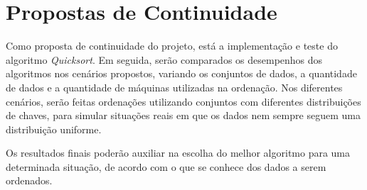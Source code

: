  
\section{Propostas de Continuidade}



Como proposta de continuidade do projeto, está a implementação e teste do algoritmo \textit{Quicksort}. 
Em seguida, serão comparados os desempenhos dos algoritmos nos cenários propostos, variando os conjuntos de dados,  a quantidade
de dados e a quantidade de máquinas utilizadas na ordenação. Nos diferentes cenários, serão feitas ordenações utilizando conjuntos com diferentes distribuições de chaves,
para simular situações reais em que os dados nem sempre seguem uma distribuição uniforme.

Os resultados finais poderão auxiliar na escolha do melhor algoritmo para uma determinada situação, de acordo com o que se conhece dos dados a serem ordenados.  
